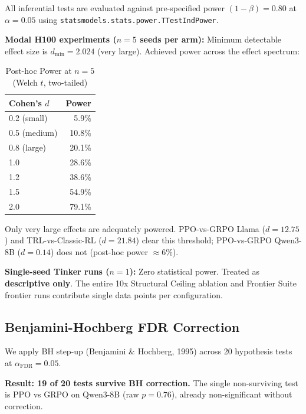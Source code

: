 \documentclass[12pt,a4paper]{report}
\theoremstyle{definition}
\begin{document}
All inferential tests are evaluated against pre-specified power $(1 - \beta) = 0.80$ at $\alpha = 0.05$
using \texttt{statsmodels.stats.power.TTestIndPower}.

\textbf{Modal H100 experiments ($n = 5$ seeds per arm):} Minimum detectable effect size is
$d_{\min} = 2.024$ (very large). Achieved power across the effect spectrum:

\begin{table}[htbp]
\centering
\caption{Post-hoc Power at $n = 5$ (Welch $t$, two-tailed)}
\label{tab:power}
\begin{tabular}{lr}
\toprule
\textbf{Cohen's $d$} & \textbf{Power} \\
\midrule
0.2 (small)  & 5.9\% \\
0.5 (medium) & 10.8\% \\
0.8 (large)  & 20.1\% \\
1.0 & 28.6\% \\
1.2 & 38.6\% \\
1.5 & 54.9\% \\
2.0 & 79.1\% \\
\bottomrule
\end{tabular}
\end{table}

Only very large effects are adequately powered. PPO-vs-GRPO Llama ($d = 12.75$) and
TRL-vs-Classic-RL ($d = 21.84$) clear this threshold; PPO-vs-GRPO Qwen3-8B ($d = 0.14$) does not
(post-hoc power $\approx 6\%$).

\textbf{Single-seed Tinker runs ($n = 1$):} Zero statistical power. Treated as \textbf{descriptive only}.
The entire 10x Structural Ceiling ablation and Frontier Suite frontier runs contribute single data
points per configuration.

\subsection{Benjamini-Hochberg FDR Correction}
\label{sec:bh}

We apply BH step-up (Benjamini \& Hochberg, 1995) across 20 hypothesis tests at $\alpha_{\text{FDR}} = 0.05$.

\textbf{Result: 19 of 20 tests survive BH correction.} The single non-surviving test is
PPO vs GRPO on Qwen3-8B (raw $p = 0.76$), already non-significant without correction.
\end{document}
